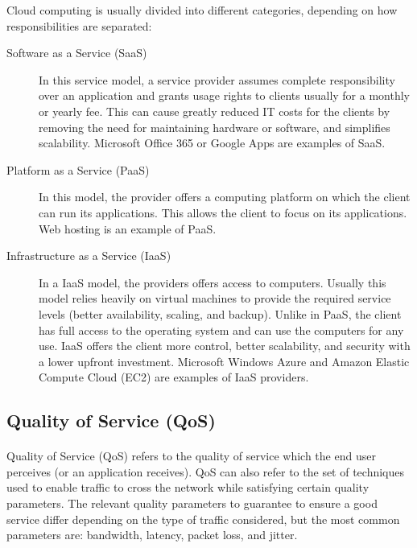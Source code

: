 Cloud computing is usually divided into different categories, depending on how responsibilities are separated\cite{peter_mell_nist_2011}:

\begin{description}
\item[Software as a Service (SaaS)]
In this service model, a service provider assumes complete responsibility over an application and grants usage rights to clients usually for a monthly or yearly fee.
This can cause greatly reduced IT costs for the clients by removing the need for maintaining hardware or software, and simplifies scalability.
Microsoft Office 365 or Google Apps are examples of SaaS.

\item[Platform as a Service (PaaS)] 
In this model, the provider offers a computing platform on which the client can run its applications. This allows the client to focus on its applications.
Web hosting is an example of PaaS. 

\item[Infrastructure as a Service (IaaS)] 
In a IaaS model, the providers offers access to computers. Usually this model relies heavily on virtual machines to provide the required service levels (better availability, scaling, and backup). Unlike in PaaS, the client has full access to the operating system and can use the computers for any use.
IaaS offers the client more control, better scalability, and security with a lower upfront investment. 
Microsoft Windows Azure and Amazon Elastic Compute Cloud (EC2) are examples of IaaS providers.

\end{description}



\subsection{Quality of Service (QoS)}
\paragraph{}
Quality of Service (QoS) refers to the quality of service which the end user perceives (or an application receives). QoS can also refer to the set of techniques used to enable traffic to cross the network while satisfying certain quality parameters. The relevant quality parameters to guarantee to ensure a good service differ depending on the type of traffic considered, but the most common parameters are: bandwidth, latency, packet loss, and jitter.

